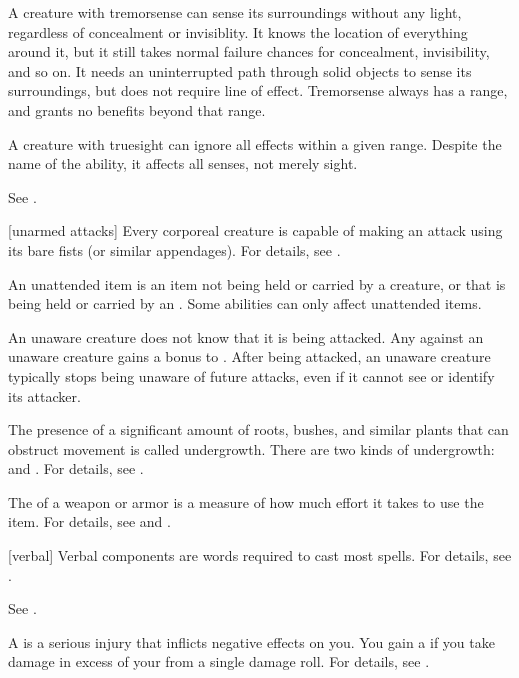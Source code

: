  A creature with tremorsense can sense its surroundings without any light, regardless of concealment or invisiblity.
It knows the location of everything around it, but it still takes normal failure chances for concealment, invisibility, and so on.
It needs an uninterrupted path through solid objects to sense its surroundings, but does not require line of effect.
Tremorsense always has a range, and grants no benefits beyond that range.

 A creature with truesight can ignore all  effects within a given range.
Despite the name of the ability, it affects all senses, not merely sight.

 See .

[unarmed attacks] Every corporeal creature is capable of making an attack using its bare fists (or similar appendages).
For details, see .

 An unattended item is an item not being held or carried by a creature, or that is being held or carried by an .
Some abilities can only affect unattended items.

 An unaware creature does not know that it is being attacked.
Any  against an unaware creature gains a  bonus to .
After being attacked, an unaware creature typically stops being unaware of future attacks, even if it cannot see or identify its attacker.

 The presence of a significant amount of roots, bushes, and similar plants that can obstruct movement is called undergrowth.
There are two kinds of undergrowth:  and .
For details, see .

 The  of a weapon or armor is a measure of how much effort it takes to use the item.
For details, see  and .

[verbal] Verbal components are words required to cast most spells.
For details, see .

 See .

 A  is a serious injury that inflicts negative effects on you.
You gain a  if you take damage in excess of your  from a single damage roll.
For details, see .

